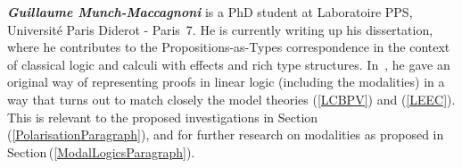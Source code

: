\documentclass[11pt,twocolumn]{article}
\newcommand{\pref}[1]{\,(\ref{#1})}
\newcommand{\eg}{\emph{eg.}}
\newcommand{\SysL}{$L$}%
\begin{document}
\smallskip\noindent
\textbf{\em Guillaume Munch-Maccagnoni} 
%
%
is a PhD student at Laboratoire PPS, Universit\'e Paris Diderot - Paris~7.
He is currently writing up his dissertation, where he contributes to the
Propositions-as-Types correspondence %
in the context of classical logic and 
calculi %
with effects and rich type structures.  
%
%
In~\cite{Munch}, %
he gave an original way of representing proofs in linear logic (including the
modalities) in a way that turns out to match closely the model theories
(\ref{LCBPV}) and (\ref{LEEC}).  This is relevant to the proposed
investigations in Section\mbox{\pref{PolarisationParagraph}}, and for further
research on modalities as proposed in Section\pref{ModalLogicsParagraph}.
%

\end{document}
